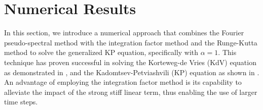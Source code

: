 \documentclass[10pt]{article}
\numberwithin{equation}{section}
\newcommand{\ff}{\varphi}
\newcommand{\lam}{\lambda}
\newcommand{\x}{{X_\alpha}}
\newcommand{\mo}{\mu_1}  \newcommand{\po}{{p_1}}
\newcommand{\moo}{\mu_2}  \newcommand{\poo}{{p_2}}
\newcommand{\al}{\alpha}
\begin{document}
	
	\section{Numerical Results}\label{sect-numerical-s}
	In this section, we introduce a numerical approach that combines the Fourier pseudo-spectral method with the integration factor method and the Runge-Kutta method to solve the generalized KP equation, specifically with $\alpha=1$. This technique has proven successful in solving the Korteweg-de Vries (KdV) equation as demonstrated in \cite{trefethen}, and the Kadomtsev-Petviashvili (KP) equation as shown in \cite{klein-roidot, ksm}. An advantage of employing the integration factor method is its capability to alleviate the impact of the strong stiff linear term, thus enabling the use of larger time steps.
	
\end{document}
